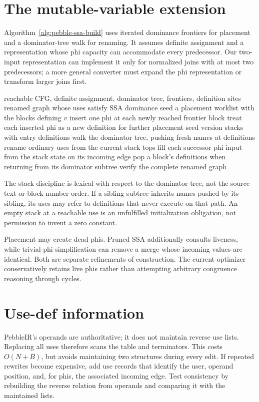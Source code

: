 \section{The mutable-variable extension}
\label{sec:pebble-ssa-extension}
Algorithm~\ref{alg:pebble-ssa-build} uses iterated dominance frontiers for placement and a dominator-tree walk for renaming.
It assumes definite assignment and a representation whose phi capacity can accommodate every predecessor.
Our two-input representation can implement it only for normalized joins with at most two predecessors; a more general converter must expand the phi representation or transform larger joins first.

\begin{algorithm}[htbp]
\caption{Converting mutable variables to SSA: an extension contract.}
\label{alg:pebble-ssa-build}
\begin{pseudocode}
\Require reachable CFG, definite assignment, dominator tree, frontiers, definition sites
\Ensure renamed graph whose uses satisfy SSA dominance
\State seed a placement worklist with the blocks defining $v$
\State insert one phi at each newly reached frontier block
\State treat each inserted phi as a new definition for further placement
\EndFor
\State seed version stacks with entry definitions
\State walk the dominator tree, pushing fresh names at definitions
\State rename ordinary uses from the current stack tops
\State fill each successor phi input from the stack state on its incoming edge
\State pop a block's definitions when returning from its dominator subtree
\State verify the complete renamed graph
\end{pseudocode}
\end{algorithm}

The stack discipline is lexical with respect to the dominator tree, not the source text or block-number order.
If a sibling subtree inherits names pushed by its sibling, its uses may refer to definitions that never execute on that path.
An empty stack at a reachable use is an unfulfilled initialization obligation, not permission to invent a zero constant.

Placement may create dead phis.
Pruned SSA additionally consults liveness, while trivial-phi simplification can remove a merge whose incoming values are identical.
Both are separate refinements of construction.
The current optimizer conservatively retains live phis rather than attempting arbitrary congruence reasoning through cycles.

\section{Use-def information}
\label{sec:pebble-use-def}
PebbleIR's operands are authoritative; it does not maintain reverse use lists.
Replacing all uses therefore scans the table and terminators.
This costs $O(N+B)$, but avoids maintaining two structures during every edit.
If repeated rewrites become expensive, add use records that identify the user, operand position, and, for phis, the associated incoming edge.
Test consistency by rebuilding the reverse relation from operands and comparing it with the maintained lists.

